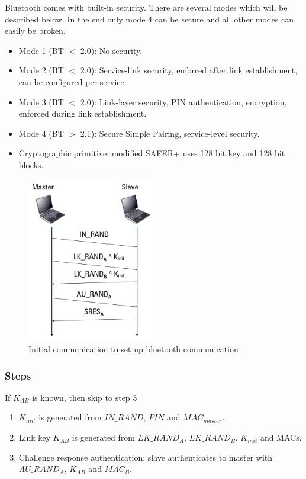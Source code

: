 \documentclass{article}
\begin{document}
Bluetooth comes with built-in security. There are several modes which will be described below. In the end only mode 4 can be secure and all other modes can easily be broken.

\begin{itemize}
\item Mode 1 (BT $<$ 2.0): No security.
\item Mode 2 (BT $<$ 2.0): Service-link security, enforced after link establishment, can be configured per service.
\item Mode 3 (BT $<$ 2.0): Link-layer security, PIN authentication, encryption, enforced during link establishment.
\item Mode 4 (BT $>$ 2.1): Secure Simple Pairing, service-level security.
\item Cryptographic primitive: modified SAFER+ uses 128 bit key and 128 bit blocks.
\end{itemize}

\begin{figure}
\includegraphics[width=5.5cm]{images/bt_communication_20.png}
\caption{Initial communication to set up bluetooth communication}
\label{fig:bt_communication_2.0}
\end{figure} 

\hspace{0.5cm}
\subsubsection*{Steps}
If $K_{AB}$ is known, then skip to step 3
\begin{enumerate}
\item $K_{init}$ is generated from $IN\_RAND$, $PIN$ and $MAC_{master}$.
\item Link key $K_{AB}$ is generated from $LK\_RAND_{A}$, $LK\_RAND_{B}$, $K_{init}$ and MACs.
\item Challenge response authentication: slave authenticates to master with $AU\_RAND_A$, $K_{AB}$ and $MAC_B$.
\end{enumerate}
\newpage
\end{document}

